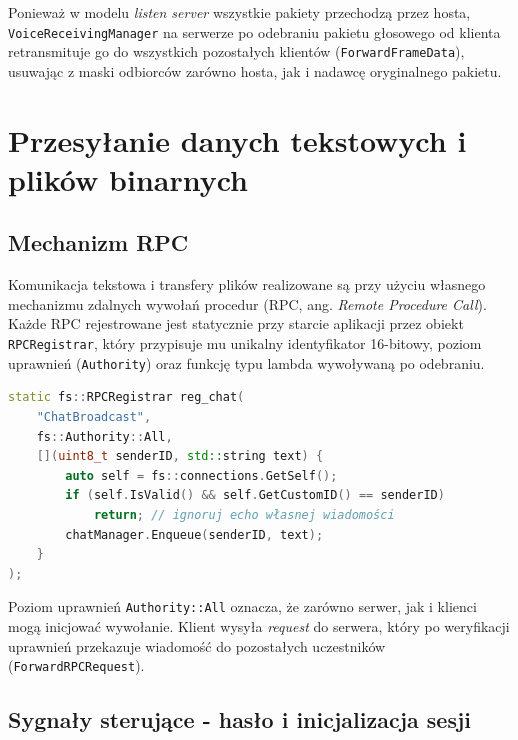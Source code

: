 Ponieważ w modelu \textit{listen server} wszystkie pakiety przechodzą
przez hosta, \texttt{VoiceReceivingManager} na serwerze po odebraniu
pakietu głosowego od klienta retransmituje go do wszystkich
pozostałych klientów (\texttt{ForwardFrameData}), usuwając z maski
odbiorców zarówno hosta, jak i nadawcę oryginalnego pakietu.


\section{Przesyłanie danych tekstowych i plików binarnych}
\label{sec:tcp}

\subsection*{Mechanizm RPC}

Komunikacja tekstowa i transfery plików realizowane są przy użyciu
własnego mechanizmu zdalnych wywołań procedur (RPC, ang.
\textit{Remote Procedure Call}). Każde RPC rejestrowane jest statycznie
przy starcie aplikacji przez obiekt \texttt{RPCRegistrar}, który przypisuje
mu unikalny identyfikator 16-bitowy, poziom uprawnień (\texttt{Authority})
oraz funkcję typu lambda wywoływaną po odebraniu.

\begin{lstlisting}[language=C++, caption={Rejestracja RPC nadawania wiadomości czatu (praca własna)}, label={lst:rpc}]
static fs::RPCRegistrar reg_chat(
    "ChatBroadcast",
    fs::Authority::All,
    [](uint8_t senderID, std::string text) {
        auto self = fs::connections.GetSelf();
        if (self.IsValid() && self.GetCustomID() == senderID)
            return; // ignoruj echo własnej wiadomości
        chatManager.Enqueue(senderID, text);
    }
);
\end{lstlisting}

Poziom uprawnień \texttt{Authority::All} oznacza, że zarówno serwer,
jak i klienci mogą inicjować wywołanie. Klient wysyła \textit{request}
do serwera, który po weryfikacji uprawnień przekazuje wiadomość
do pozostałych uczestników (\texttt{ForwardRPCRequest}).

\subsection*{Sygnały sterujące - hasło i inicjalizacja sesji}

